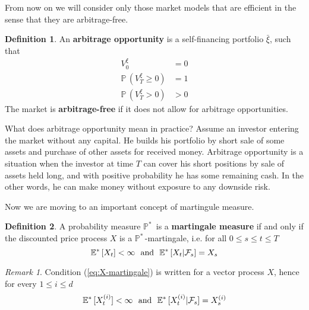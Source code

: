 \documentclass[a4paper,11pt, twoside]{book}
\theoremstyle{definition}
\newtheorem{mydef}{Definition}[chapter]
\theoremstyle{remark}
\newtheorem{remark}{Remark}[chapter]
\def\P{{\mathbb{P}}\,}
\def\Em{{\mathbb{E}^*}\,}
\def\Pm{{\mathbb{P}}^*\,}
\def\xia{\bar{\xi}}
\begin{document}
From now on we will consider only those market models that are efficient in the sense that they are arbitrage-free.
\begin{mydef}
 An \textbf{arbitrage opportunity} is a self-financing portfolio $\xia$, such that
 \begin{align*}
  V^{\xi}_0 &= 0\\
  \P(V^{\xi}_T \geq 0) &= 1\\
  \P(V^{\xi}_T > 0 ) &> 0
 \end{align*}
 The market is \textbf{arbitrage-free} if it does not allow for arbitrage opportunities.
\end{mydef}
What does arbitrage opportunity mean in practice? Assume an investor entering the market without any capital. He builds his portfolio by short sale of some assets and purchase of other assets for received money. Arbitrage opportunity is a situation when the investor at time $T$ can cover his short positions by sale of assets held long, and with positive probability he has some remaining cash.
In the other words, he can make money without exposure to any downside risk. 

Now we are moving to an important concept of martingule measure.
\begin{mydef}
 A probability measure $\Pm$ is a \textbf{martingale measure} if and only if the discounted price process $X$ is a $\Pm$-martingale, i.e. for all  $0 \leq s \leq t \leq T$
 \begin{equation}
  \label{eq:X-martingale}
  \Em[X_t] < \infty \hbox{\ \ and\ \ } \Em[X_t | \mathcal{F}_s] = X_s
 \end{equation}
\end{mydef}

\begin{remark}
 Condition (\ref{eq:X-martingale}) is written for a vector process $X$, hence for every $1 \leq i \leq d$
  \begin{equation*}
  \Em[X^{(i)}_t] < \infty \hbox{\ \ and\ \ } \Em[X^{(i)}_t | \mathcal{F}_s] = X^{(i)}_s
 \end{equation*}
\end{remark}
\end{document}
